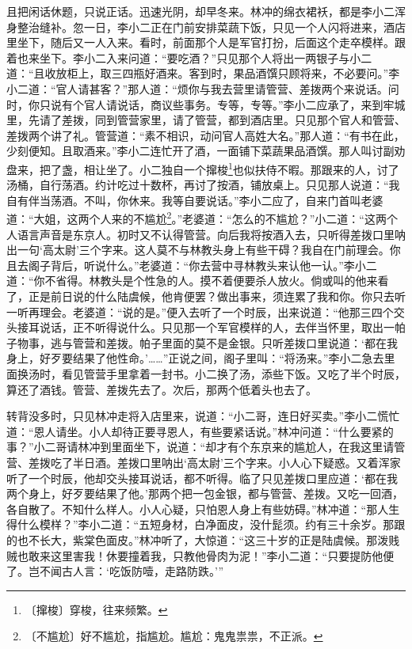 \documentclass[12pt,UTF-8,openany]{ctexbook}
\begin{document}
\begin{normalsize}
    且把闲话休题，只说正话。迅速光阴，却早冬来。林冲的绵衣裙袄，都是李小二浑身整治缝补。忽一日，李小二正在门前安排菜蔬下饭，只见一个人闪将进来，酒店里坐下，随后又一人入来。看时，前面那个人是军官打扮，后面这个走卒模样。跟着也来坐下。李小二入来问道：“要吃酒？”只见那个人将出一两银子与小二道：“且收放柜上，取三四瓶好酒来。客到时，果品酒馔只顾将来，不必要问。”李小二道：“官人请甚客？”那人道：“烦你与我去营里请管营、差拨两个来说话。问时，你只说有个官人请说话，商议些事务。专等，专等。”李小二应承了，来到牢城里，先请了差拨，同到管营家里，请了管营，都到酒店里。只见那个官人和管营、差拨两个讲了礼。管营道：“素不相识，动问官人高姓大名。”那人道：“有书在此，少刻便知。且取酒来。”李小二连忙开了酒，一面铺下菜蔬果品酒馔。那人叫讨副劝盘来，把了盏，相让坐了。小二独自一个撺梭\footnote{〔撺梭〕穿梭，往来频繁。}也似扶侍不暇。那跟来的人，讨了汤桶，自行荡酒。约计吃过十数杯，再讨了按酒，铺放桌上。只见那人说道：“我自有伴当荡酒。不叫，你休来。我等自要说话。”李小二应了，自来门首叫老婆道：“大姐，这两个人来的不尴尬\footnote{〔不尴尬〕好不尴尬，指尴尬。尴尬：鬼鬼祟祟，不正派。}。”老婆道：“怎么的不尴尬？”小二道：“这两个人语言声音是东京人。初时又不认得管营。向后我将按酒入去，只听得差拨口里呐出一句‘高太尉’三个字来。这人莫不与林教头身上有些干碍？我自在门前理会。你且去阁子背后，听说什么。”老婆道：“你去营中寻林教头来认他一认。”李小二道：“你不省得。林教头是个性急的人。摸不着便要杀人放火。倘或叫的他来看了，正是前日说的什么陆虞候，他肯便罢？做出事来，须连累了我和你。你只去听一听再理会。老婆道：“说的是。”便入去听了一个时辰，出来说道：“他那三四个交头接耳说话，正不听得说什么。只见那一个军官模样的人，去伴当怀里，取出一帕子物事，逃与管营和差拨。帕子里面的莫不是金银。只听差拨口里说道：‘都在我身上，好歹要结果了他性命。’……”正说之间，阁子里叫：“将汤来。”李小二急去里面换汤时，看见管营手里拿着一封书。小二换了汤，添些下饭。又吃了半个时辰，算还了酒钱。管营、差拨先去了。次后，那两个低着头也去了。
    
    转背没多时，只见林冲走将入店里来，说道：“小二哥，连日好买卖。”李小二慌忙道：“恩人请坐。小人却待正要寻恩人，有些要紧话说。”林冲问道：“什么要紧的事？”小二哥请林冲到里面坐下，说道：“却才有个东京来的尴尬人，在我这里请管营、差拨吃了半日酒。差拨口里呐出‘高太尉’三个字来。小人心下疑惑。又着浑家听了一个时辰，他却交头接耳说话，都不听得。临了只见差拨口里应道：‘都在我两个身上，好歹要结果了他。’那两个把一包金银，都与管营、差拨。又吃一回酒，各自散了。不知什么样人。小人心疑，只怕恩人身上有些妨碍。”林冲道：“那人生得什么模样？”李小二道：“五短身材，白净面皮，没什髭须。约有三十余岁。那跟的也不长大，紫棠色面皮。”林冲听了，大惊道：“这三十岁的正是陆虞候。那泼贱贼也敢来这里害我！休要撞着我，只教他骨肉为泥！”李小二道：“只要提防他便了。岂不闻古人言：‘吃饭防噎，走路防跌。’”
    

\end{normalsize}
\end{document}
